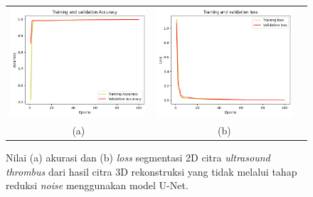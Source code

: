 \begin{enumerate}
	
	\begin{figure}[htbp]
		\centering
		\begin{tabular}{ccc}
			\includegraphics[scale=0.5]{bab4/Rekap Training/UNet/Ori/5/acc_99,75365400314331.png} &
			\includegraphics[scale=0.5]{bab4/Rekap Training/UNet/Ori/5/loss_0,0061.png} & \\
			(a) & (b)    %
		\end{tabular}
		\caption{Nilai (a) akurasi dan (b) \textit{loss} segmentasi 2D citra \textit{ultrasound} \textit{thrombus} dari hasil citra 3D rekonstruksi yang tidak melalui tahap reduksi \textit{noise} menggunakan model U-Net.}
		\label{fig:performance-ori-unet-rekonstruksi}
	\end{figure}
	

\end{enumerate}
